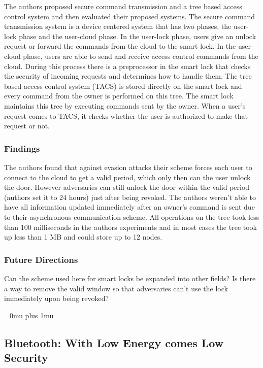 \noindent
The authors proposed secure command transmission and a tree based access control system and then evaluated their proposed systems. The secure command transmission system is a device centered system that has two phases, the user-lock phase and the user-cloud phase. In the user-lock phase, users give an unlock request or forward the commands from the cloud to the smart lock. In the user-cloud phase, users are able to send and receive access control commands from the cloud. During this process there is a preprocessor in the smart lock that checks the security of incoming requests and determines how to handle them. The tree based access control system (TACS) is stored directly on the smart lock and every command from the owner is performed on this tree. The smart lock maintains this tree by executing commands sent by the owner. When a user’s request comes to TACS, it checks whether the user is authorized to make that request or not. 



\subsubsection{Findings}

\noindent
The authors found that against evasion attacks their scheme forces each user to connect to the cloud to get a valid period, which only then can the user unlock the door. However adversaries can still unlock the door within the valid period (authors set it to 24 hours) just after being revoked. The authors weren’t able to have all information updated immediately after an owner's command is sent due to their asynchronous communication scheme. All operations on the tree took less than 100 milliseconds in the authors experiments and in most cases the tree took up less than 1 MB and could store up to 12 nodes.

\subsubsection{Future Directions}

\noindent
Can the scheme used here for smart locks be expanded into other fields? Is there a way to remove the valid window so that adversaries can’t use the lock immediately upon being revoked?


\Urlmuskip=0mu plus 1mu\relax


\noindent
\subsection{Bluetooth: With Low Energy comes Low Security}


